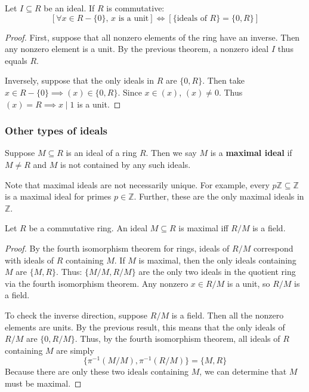 \documentclass{article}
\theoremstyle{plain}
\newcommand{\Z}{\mathbb{Z}}
\begin{document}
\begin{theorem}{}{}
Let $I \subseteq R$ be an ideal. If $R$ is commutative:
$$[\forall x \in R-\{0\} \text{, $x$ is a unit}]
\iff 
[\{\text{ideals of } R\} = \{0,R\}]$$
\end{theorem}
\begin{proof}
First, suppose that all nonzero elements of the ring have an inverse. Then any nonzero element is a unit. By the previous theorem, a nonzero ideal $I$ thus equals $R$.

Inversely, suppose that the only ideals in $R$ are $\{0,R\}$. Then take $x \in R - \{0\} \implies (x) \in \{0,R\}$. Since $x \in (x)$, $(x) \ne 0$. Thus $(x) = R \implies x \mid 1$ is a unit.
\end{proof}

\subsubsection{Other types of ideals}
\begin{definition}{}{}
Suppose $M \subseteq R$ is an ideal of a ring $R$. Then we say $M$ is a \textbf{maximal ideal} if $M \ne R$ and $M$ is not contained by any such ideals.
\end{definition}
Note that maximal ideals are not necessarily unique. For example, every $p\Z \subseteq \Z$ is a maximal ideal for primes $p \in \Z$. Further, these are the only maximal ideals in $\Z$.

\begin{theorem}{}{}
Let $R$ be a commutative ring. An ideal $M \subseteq R$ is maximal iff $R/M$ is a field.
\end{theorem}
\begin{proof}
By the fourth isomorphism theorem for rings, ideals of $R/M$ correspond with ideals of $R$ containing $M$. If $M$ is maximal, then the only ideals containing $M$ are $\{M,R\}$. Thus: $\{ M/M, R/M \}$ are the only two ideals in the quotient ring via the fourth isomorphism theorem. Any nonzero $x \in R/M$ is a unit, so $R/M$ is a field.

To check the inverse direction, suppose $R/M$ is a field. Then all the nonzero elements are units. By the previous result, this means that the only ideals of $R/M$ are $\{0,R/M\}$. Thus, by the fourth isomorphism theorem, all ideals of $R$ containing $M$ are simply $$\{\pi^{-1}(M/M), \pi^{-1}(R/M)\} = \{M,R\}$$
Because there are only these two ideals containing $M$, we can determine that $M$ must be maximal.
\end{proof}
\end{document}
